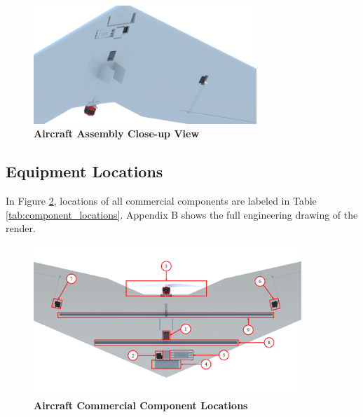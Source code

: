         \begin{figure}[H]
            \centering
            \includegraphics[width=0.75\textwidth]{homeworks/homework4/report/Figure/aircraft_assembly_3.png}
            \caption{\textbf{Aircraft Assembly Close-up View}}
            \label{fig:closeup_render}
        \end{figure}
    
    \subsection{Equipment Locations}
    
        In Figure \ref{fig:component_locations}, locations of all commercial components are labeled in Table \ref{tab:component_locations}. Appendix B shows the full engineering drawing of the render.
        
        \begin{figure}[H]
            \centering
            \includegraphics[width=0.9\textwidth]{homeworks/homework4/report/Figure/aircraft_assembly_underbelly_labeled.png}
            \caption{\textbf{Aircraft Commercial Component Locations}}
            \label{fig:component_locations}
        \end{figure}
        
